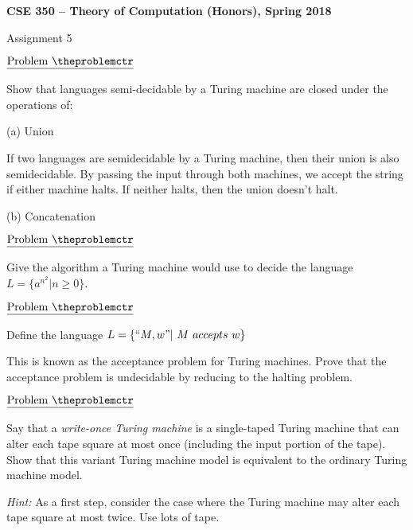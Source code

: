 \documentclass[11pt]{article}
\def\pp{\par\noindent}
\newenvironment{mathline}{\begin{adjustwidth}{0.5cm}{}}{\end{adjustwidth}}
\begin{document}
\centerline{\bf CSE 350 -- Theory of Computation (Honors), Spring 2018}
\medskip
\centerline{Assignment 5}
\bigskip
\bigskip


\bigskip
\bigskip

\addtocounter{problemctr}{1}

\noindent $\underline{\rm Problem\ \theproblemctr}$\pp

\noindent Show that languages semi-decidable by a Turing machine are closed under the operations of:

\noindent(a) Union

\begin{mathline}
If two languages are semidecidable by a Turing machine, then their union is also semidecidable. By passing the input through both machines, we accept the string if either machine halts. If neither halts, then the union doesn't halt.
\end{mathline}

\noindent(b) Concatenation

\bigskip
\bigskip

\addtocounter{problemctr}{1}

\noindent $\underline{\rm Problem\ \theproblemctr}$\pp

\noindent Give the algorithm a Turing machine would use to decide the language $L = \{a^{n^2} | n \geq 0\}$.

\bigskip
\bigskip

\addtocounter{problemctr}{1}

\noindent $\underline{\rm Problem\ \theproblemctr}$\pp

\noindent Define the language $L = \{``M,w" |\ M\ accepts\ w\}$ \pp

\noindent This is known as the acceptance problem for Turing machines. Prove
that the acceptance problem is undecidable by reducing to the halting problem.


\bigskip
\bigskip

\addtocounter{problemctr}{1}

\noindent $\underline{\rm Problem\ \theproblemctr}$\pp

\noindent Say that a \emph{write-once Turing machine} is a
single-taped Turing machine that can alter each tape square at most
once (including the input portion of the tape).  Show that this
variant Turing machine model is equivalent to the ordinary Turing
machine model.

\noindent \emph{Hint:} As a first step, consider the case where the
Turing machine may alter each tape square at most twice.  Use lots
of tape.
\end{document}

